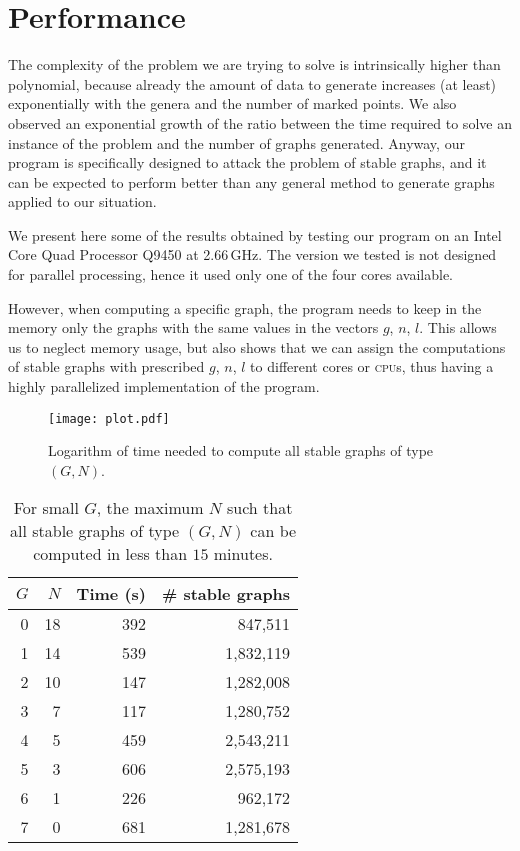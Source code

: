 \documentclass{amsart}
\theoremstyle{plain}
\theoremstyle{definition}
\begin{document}
\section{Performance}\label{sec:performance}

The complexity of the problem we are trying to solve is intrinsically
higher than polynomial, because already the amount of data to generate
increases (at least) exponentially with the genera and the number of
marked points. We also observed an exponential growth of the ratio
between the time required to solve an instance of the problem and the
number of graphs generated. Anyway, our program is specifically
designed to attack the problem of stable graphs, and it can be
expected to perform better than any general method to generate graphs
applied to our situation.

We present here some of the results obtained by testing our program on
an Intel\textregistered{} Core Quad Processor Q9450 at
2.66\,GHz. The version we tested is not designed for parallel
processing, hence it used only one of the four cores available.

However, when computing a specific graph, the program needs to keep in
the memory only the graphs with the same values in the vectors $g$,
$n$, $l$. This allows us to neglect memory usage, but also shows that
we can assign the computations of stable graphs with prescribed $g$,
$n$, $l$ to different cores or \textsc{cpu}s, thus having a highly
parallelized implementation of the program.

\begin{figure}[t]
  \texttt{[image: plot.pdf]}
  \caption{Logarithm of time needed to compute all stable graphs of
    type $(G, N)$.}\label{fig:plot}
\end{figure}

\begin{table}[t]
  \begin{tabular}{rrrr}
    $G$ & $N$ & Time (s) & \# stable graphs\\
    \hline
    0 & 18 & 392 &   847,511\\
    1 & 14 & 539 & 1,832,119\\
    2 & 10 & 147 & 1,282,008\\
    3 &  7 & 117 & 1,280,752\\
    4 &  5 & 459 & 2,543,211\\
    5 &  3 & 606 & 2,575,193\\
    6 &  1 & 226 &   962,172\\
    7 &  0 & 681 & 1,281,678
  \end{tabular}\vspace{\baselineskip}
  \caption{For small $G$, the maximum $N$ such that all stable graphs of type $(G,N)$ can be computed in less than $15$ minutes.}\label{tab:number}
\end{table}
\end{document}
